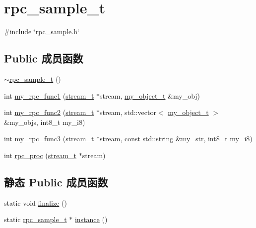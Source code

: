 \hypertarget{classrpc__sample_1_1rpc__sample__t}{}\section{rpc\+\_\+sample\+\_\+t}
\label{classrpc__sample_1_1rpc__sample__t}


{\ttfamily \#include \char`\"{}rpc\+\_\+sample.\+h\char`\"{}}

\subsection*{Public 成员函数}
\begin{DoxyCompactItemize}
\item 
\hyperlink{classrpc__sample_1_1rpc__sample__t_a5fadb73b0293c923802be0585ed0aef7}{$\sim$rpc\+\_\+sample\+\_\+t} ()
\item 
int \hyperlink{classrpc__sample_1_1rpc__sample__t_a6816697300fea69a29dd9ee4225c70be}{my\+\_\+rpc\+\_\+func1} (\hyperlink{config_8h_a261dba04f46f5c59a68a05f69f5a65a8}{stream\+\_\+t} $\ast$stream, \hyperlink{structrpc__sample_1_1my__object__t}{my\+\_\+object\+\_\+t} \&my\+\_\+obj)
\item 
int \hyperlink{classrpc__sample_1_1rpc__sample__t_ae15eff7ca37c2490467a6b8244af5898}{my\+\_\+rpc\+\_\+func2} (\hyperlink{config_8h_a261dba04f46f5c59a68a05f69f5a65a8}{stream\+\_\+t} $\ast$stream, std\+::vector$<$ \hyperlink{structrpc__sample_1_1my__object__t}{my\+\_\+object\+\_\+t} $>$ \&my\+\_\+objs, int8\+\_\+t my\+\_\+i8)
\item 
int \hyperlink{classrpc__sample_1_1rpc__sample__t_ab66cd17879eff5b0f41e8b35477c579f}{my\+\_\+rpc\+\_\+func3} (\hyperlink{config_8h_a261dba04f46f5c59a68a05f69f5a65a8}{stream\+\_\+t} $\ast$stream, const std\+::string \&my\+\_\+str, int8\+\_\+t my\+\_\+i8)
\item 
int \hyperlink{classrpc__sample_1_1rpc__sample__t_a33828bf33ef507e4b26d259f74704d53}{rpc\+\_\+proc} (\hyperlink{config_8h_a261dba04f46f5c59a68a05f69f5a65a8}{stream\+\_\+t} $\ast$stream)
\end{DoxyCompactItemize}
\subsection*{静态 Public 成员函数}
\begin{DoxyCompactItemize}
\item 
static void \hyperlink{classrpc__sample_1_1rpc__sample__t_a32d626626eee0bc4ade146973f6abb1c}{finalize} ()
\item 
static \hyperlink{classrpc__sample_1_1rpc__sample__t}{rpc\+\_\+sample\+\_\+t} $\ast$ \hyperlink{classrpc__sample_1_1rpc__sample__t_ad041951322824124d5b5f0ab8c9fc6f1}{instance} ()
\end{DoxyCompactItemize}
